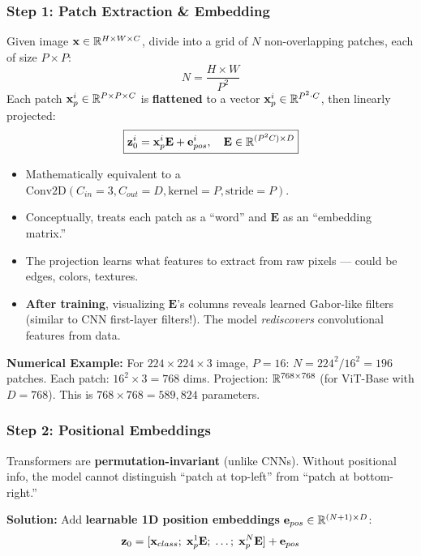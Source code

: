 \subsubsection{Step 1: Patch Extraction \& Embedding}
Given image $\mathbf{x} \in \mathbb{R}^{H \times W \times C}$, divide into a grid of $N$ non-overlapping patches, each of size $P \times P$:
$$N = \frac{H \times W}{P^2}$$
Each patch $\mathbf{x}_p^i \in \mathbb{R}^{P \times P \times C}$ is \textbf{flattened} to a vector $\mathbf{x}_p^i \in \mathbb{R}^{P^2 \cdot C}$, then linearly projected:
\begin{equation}\label{eq:patch_embed}
\boxed{\mathbf{z}_0^i = \mathbf{x}_p^i \mathbf{E} + \mathbf{e}_{pos}^i, \quad \mathbf{E} \in \mathbb{R}^{(P^2C) \times D}}
\end{equation}

\begin{keybox}
\begin{itemize}
\item Mathematically equivalent to a $\text{Conv2D}(C_{in}{=}3, C_{out}{=}D, \text{kernel}{=}P, \text{stride}{=}P)$.
\item Conceptually, treats each patch as a ``word'' and $\mathbf{E}$ as an ``embedding matrix.''
\item The projection learns what features to extract from raw pixels — could be edges, colors, textures.
\item \textbf{After training}, visualizing $\mathbf{E}$'s columns reveals learned Gabor-like filters (similar to CNN first-layer filters!). The model \emph{rediscovers} convolutional features from data.
\end{itemize}
\end{keybox}

\textbf{Numerical Example:} For $224 \times 224 \times 3$ image, $P{=}16$:
$N = 224^2/16^2 = 196$ patches. Each patch: $16^2 \times 3 = 768$ dims. Projection: $\mathbb{R}^{768 \times 768}$ (for ViT-Base with $D{=}768$). This is $768 \times 768 = 589,824$ parameters.

\subsubsection{Step 2: Positional Embeddings}
Transformers are \textbf{permutation-invariant} (unlike CNNs). Without positional info, the model cannot distinguish ``patch at top-left'' from ``patch at bottom-right.''

\textbf{Solution:} Add \textbf{learnable 1D position embeddings} $\mathbf{e}_{pos} \in \mathbb{R}^{(N+1) \times D}$:
$$\mathbf{z}_0 = [\mathbf{x}_{class};\; \mathbf{x}_p^1\mathbf{E};\; \ldots;\; \mathbf{x}_p^N\mathbf{E}] + \mathbf{e}_{pos}$$

